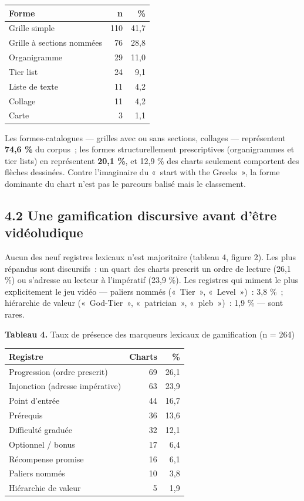 \documentclass[11pt,a4paper]{article}
\begin{document}
\begin{center}\small
\begin{tabular}{lrr}
\toprule
\textbf{Forme} & \textbf{n} & \textbf{\%} \\
\midrule
Grille simple & 110 & 41,7 \\
Grille à sections nommées & 76 & 28,8 \\
Organigramme & 29 & 11,0 \\
Tier list & 24 & 9,1 \\
Liste de texte & 11 & 4,2 \\
Collage & 11 & 4,2 \\
Carte & 3 & 1,1 \\
\bottomrule
\end{tabular}
\end{center}

Les formes-catalogues --- grilles avec ou sans sections, collages --- représentent \textbf{74,6 \%} du corpus~; les formes structurellement prescriptives (organigrammes et tier lists) en représentent \textbf{20,1 \%}, et 12,9 \% des charts seulement comportent des flèches dessinées. Contre l'imaginaire du «~start with the Greeks~», la forme dominante du chart n'est pas le parcours balisé mais le classement.

\subsection*{4.2 Une gamification discursive avant d'être vidéoludique}

Aucun des neuf registres lexicaux n'est majoritaire (tableau 4, figure 2). Les plus répandus sont discursifs~: un quart des charts prescrit un ordre de lecture (26,1 \%) ou s'adresse au lecteur à l'impératif (23,9 \%). Les registres qui miment le plus explicitement le jeu vidéo --- paliers nommés («~Tier~», «~Level~»)~: 3,8 \%~; hiérarchie de valeur («~God-Tier~», «~patrician~», «~pleb~»)~: 1,9 \% --- sont rares.

\noindent \textbf{Tableau 4.} Taux de présence des marqueurs lexicaux de gamification (n = 264)\\[-0.2em]

\begin{center}\small
\begin{tabular}{lrr}
\toprule
\textbf{Registre} & \textbf{Charts} & \textbf{\%} \\
\midrule
Progression (ordre prescrit) & 69 & 26,1 \\
Injonction (adresse impérative) & 63 & 23,9 \\
Point d'entrée & 44 & 16,7 \\
Prérequis & 36 & 13,6 \\
Difficulté graduée & 32 & 12,1 \\
Optionnel / bonus & 17 & 6,4 \\
Récompense promise & 16 & 6,1 \\
Paliers nommés & 10 & 3,8 \\
Hiérarchie de valeur & 5 & 1,9 \\
\bottomrule
\end{tabular}
\end{center}
\end{document}
